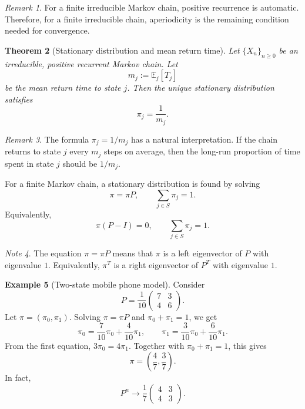\documentclass[11pt]{article}
\theoremstyle{plain}
\newtheorem{theorem}{Theorem}[section]
\theoremstyle{definition}
\newtheorem{example}[theorem]{Example}
\theoremstyle{remark}
\newtheorem{remark}[theorem]{Remark}
\newtheorem{note}[theorem]{Note}
\begin{document}
	\begin{remark}
		For a finite irreducible Markov chain, positive recurrence is automatic. Therefore, for a finite irreducible chain, aperiodicity is the remaining condition needed for convergence.
	\end{remark}
	
	\begin{theorem}[Stationary distribution and mean return time]
		Let \(\{X_n\}_{n\ge 0}\) be an irreducible, positive recurrent Markov chain. Let
		\[
		m_j:=\mathbb{E}_j[T_j]
		\]
		be the mean return time to state \(j\). Then the unique stationary distribution satisfies
		\[
		\pi_j=\frac{1}{m_j}.
		\]
	\end{theorem}
	
	\begin{remark}
		The formula \(\pi_j=1/m_j\) has a natural interpretation. If the chain returns to state \(j\) every \(m_j\) steps on average, then the long-run proportion of time spent in state \(j\) should be \(1/m_j\).
	\end{remark}
	
	
	
	
	
	For a finite Markov chain, a stationary distribution is found by solving
	\[
	\pi=\pi P,
	\qquad
	\sum_{j\in S}\pi_j=1.
	\]
	Equivalently,
	\[
	\pi(P-I)=0,
	\qquad
	\sum_{j\in S}\pi_j=1.
	\]
	
	\begin{note}
		The equation \(\pi=\pi P\) means that \(\pi\) is a left eigenvector of \(P\) with eigenvalue \(1\). Equivalently, \(\pi^T\) is a right eigenvector of \(P^T\) with eigenvalue \(1\).
	\end{note}
	
	\begin{example}[Two-state mobile phone model]
		Consider
		\[
		P=
		\frac{1}{10}
		\begin{pmatrix}
			7 & 3\\
			4 & 6
		\end{pmatrix}.
		\]
		Let \(\pi=(\pi_0,\pi_1)\). Solving \(\pi=\pi P\) and \(\pi_0+\pi_1=1\), we get
		\[
		\pi_0=\frac{7}{10}\pi_0+\frac{4}{10}\pi_1,
		\qquad
		\pi_1=\frac{3}{10}\pi_0+\frac{6}{10}\pi_1.
		\]
		From the first equation, \(3\pi_0=4\pi_1\). Together with \(\pi_0+\pi_1=1\), this gives
		\[
		\pi=\left(\frac47,\frac37\right).
		\]
		In fact,
		\[
		P^n\to
		\frac{1}{7}
		\begin{pmatrix}
			4 & 3\\
			4 & 3
		\end{pmatrix}.
		\]
	\end{example}
	
\end{document}
